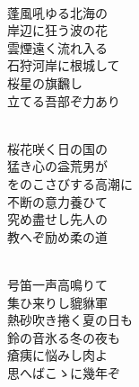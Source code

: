 \documentclass[10pt,b5j]{tarticle} %
\begin{document}
\vspace{1.5em} %
\newcommand{\linespace}{0.5em} %
\newcommand{\blocksize}{0.5\hsize} %
\newcommand{\itemmargin}{3em} %
\begin{enumerate} %
    \setlength{\itemindent}{\itemmargin} %
    \begin{minipage}[c]{\blocksize}
    
        \vspace{\linespace}
        \item~\\
        蓬風吼ゆる北海の\\
        岸辺に狂う波の花\\
        雲煙遠く流れ入る\\
        石狩河岸に根城して\\
        桜星の旗飜し\\
        立てる吾部ぞ力あり
        
    \end{minipage}
    \begin{minipage}[c]{\blocksize}
        
        \vspace{\linespace}
        \item~\\
        桜花咲く日の国の\\
        猛き心の益荒男が\\
        をのこさびする高潮に\\
        不断の意力養ひて\\
        究め盡せし先人の\\
        教へぞ励め柔の道
        
    \end{minipage}
    \begin{minipage}[c]{\blocksize}
        
        \vspace{\linespace}
        \item~\\
        号笛一声高鳴りて\\
        集ひ来りし貔貅軍\\
        熱砂吹き捲く夏の日も\\
        鈴の音氷る冬の夜も\\
        瘡痍に悩みし肉よ\\
        思へばこゝに幾年ぞ
        

\end{minipage}
\end{enumerate}
\end{document}
